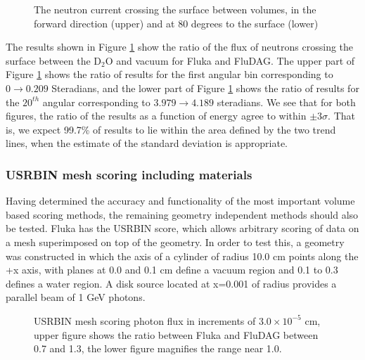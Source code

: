 \documentclass{anstrans}[12pt]
\begin{document}
\begin{figure}%
	\begin{center}
		\caption{The neutron current crossing the surface between volumes, in the 
		forward direction (upper) and at 80 degrees to the surface (lower)}\label{fig:mat_usrbdx}
	\end{center}
\end{figure}

The results shown in Figure \ref{fig:mat_usrbdx} show the ratio of the
flux of neutrons crossing the surface between the D$_2$O and vacuum
for Fluka and FluDAG. The upper part of Figure \ref{fig:mat_usrbdx} shows
the ratio of results for the first angular bin corresponding to $0
\to 0.209$ Steradians, and the lower part of Figure \ref{fig:mat_usrbdx}
shows the ratio of results for the $20^{th}$ angular corresponding to $3.979
\to 4.189$ steradians. We see that for both figures, the ratio of the
results as a function of energy agree to within $\pm 3\sigma$. That is, we
expect 99.7\% of results to lie within the area defined by the two
trend lines, when the estimate of the standard deviation is appropriate.

\subsubsection*{USRBIN mesh scoring including materials}
Having determined the accuracy and functionality of the most important 
volume based scoring methods, the remaining geometry independent methods
should also be tested.
Fluka has the USRBIN score, which allows arbitrary scoring
of data on a mesh superimposed on top of the geometry. In order to test this, a geometry
was constructed in which the axis of a cylinder of radius 10.0 cm points along the
+x axis, with planes at 0.0 and 0.1 cm define a vacuum region and 0.1 to 0.3 
defines a water region. A disk source located at x=0.001 of radius provides a 
parallel beam of 1 GeV photons.

\begin{figure}%
	\begin{center}
		\caption{USRBIN mesh scoring photon flux in increments
                  of $3.0 \times 10^{-5}$ cm, upper figure shows the ratio between
                  Fluka and FluDAG between 0.7 and 1.3, the lower
                  figure magnifies the range near 1.0. }\label{fig:mesh_phot}
	\end{center}
\end{figure}
\end{document}
